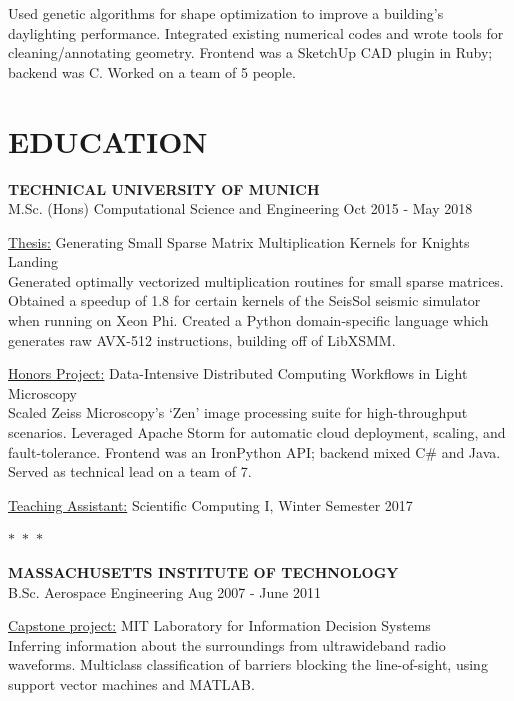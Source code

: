 \documentclass[margin]{res}
\begin{document}
\begin{resume}
		Used genetic algorithms for shape optimization to improve a building's daylighting performance. Integrated existing numerical codes and wrote tools for cleaning/annotating geometry. Frontend was a SketchUp CAD plugin in Ruby; backend was C. Worked on a team of 5 people.

	\section{EDUCATION}%
		\textbf{TECHNICAL UNIVERSITY OF MUNICH} \\
		M.Sc. (Hons) Computational Science and Engineering%
		\hfill Oct 2015 - May 2018
		
		\underline{Thesis:} Generating Small Sparse Matrix Multiplication Kernels for Knights Landing \\
			Generated optimally vectorized multiplication routines for small sparse matrices. Obtained a speedup of 1.8 for certain kernels of the SeisSol seismic simulator when running on Xeon Phi. Created a Python domain-specific language which generates raw AVX-512 instructions, building off of LibXSMM. 


		\underline{Honors Project:} Data-Intensive Distributed Computing Workflows in Light Microscopy \\
			Scaled Zeiss Microscopy's `Zen' image processing suite for high-throughput scenarios. Leveraged Apache Storm for automatic cloud deployment, scaling, and fault-tolerance. Frontend was an IronPython API; backend mixed C\# and Java. Served as technical lead on a team of 7. 

		\underline{Teaching Assistant:} Scientific Computing I, Winter Semester 2017

\begin{center}
  $\ast$~$\ast$~$\ast$
\end{center}



		\textbf{MASSACHUSETTS INSTITUTE OF TECHNOLOGY} \\
		B.Sc. Aerospace Engineering%
		\hfill Aug 2007 - June 2011

		\underline{Capstone project:} MIT Laboratory for Information Decision Systems \\
		Inferring information about the surroundings from ultrawideband radio waveforms. Multiclass classification of barriers blocking the line-of-sight, using support vector machines and MATLAB.


\end{resume}
\end{document}
